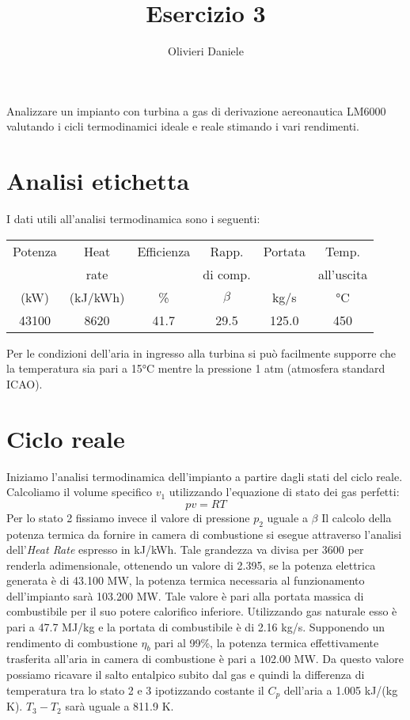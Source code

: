 \documentclass[a4paper,12pt]{article}
\title{Esercizio 3}
\author{Olivieri Daniele}
\date{}
\begin{document}
\maketitle

Analizzare un impianto con turbina a gas di derivazione aereonautica LM6000 valutando i cicli termodinamici ideale e reale stimando i vari rendimenti.
\section{Analisi etichetta}
\label{sec:analisi_etichetta}
I dati utili all'analisi termodinamica sono i seguenti:
\begin{center}
    \begin{tabular}{cccccc}
         Potenza   & Heat  & Efficienza   & Rapp.  & Portata    &  Temp. \\
                   &rate  &              & di comp. &    &        all'uscita \\
            (kW)   &  (kJ/kWh) & \%    &    $\beta$  &   kg/s      &  °C \\ \hline
        43100    &  8620    &  41.7   &  29.5  &     125.0        &  450
    \end{tabular}
\end{center}
Per le condizioni dell'aria in ingresso alla turbina si può facilmente supporre che la temperatura sia pari a 15°C mentre la pressione 1 atm
(atmosfera standard ICAO).

\section{Ciclo reale}
\label{sec:ciclo_reale}
Iniziamo l'analisi termodinamica dell'impianto a partire dagli stati del ciclo reale.
Calcoliamo il volume specifico $v_1$ utilizzando l'equazione di stato dei gas perfetti:
\begin{equation}
    \label{eq:gas_perfetti}
    pv = RT
\end{equation}
Per lo stato 2 fissiamo invece il valore di pressione $p_2$ uguale a $\beta$
Il calcolo della potenza termica da fornire in camera di combustione si esegue attraverso l'analisi dell'\textit{Heat Rate} espresso in kJ/kWh.
Tale grandezza va divisa per 3600 per renderla adimensionale, ottenendo un valore di 2.395, se la potenza elettrica generata è di 43.100 MW, 
la potenza termica necessaria al funzionamento dell'impianto sarà 103.200 MW.
Tale valore è pari alla portata massica di combustibile per il suo potere calorifico inferiore. Utilizzando gas naturale esso è pari a 47.7 MJ/kg e la portata di combustibile
è di 2.16 kg/s.
Supponendo un rendimento di combustione $\eta_b$ pari al 99\%, la potenza termica effettivamente trasferita all'aria in camera di combustione è pari a
102.00 MW. Da questo valore possiamo ricavare il salto entalpico subito dal gas e quindi la differenza di temperatura tra lo stato 2 e 3 ipotizzando costante il $C_p$
dell'aria a 1.005 kJ/(kg K).
$T_3 -T_2$ sarà uguale a 811.9 K.
\end{document}
